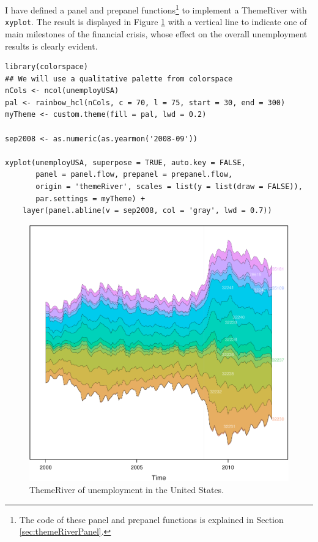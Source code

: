 \documentclass[smallroyalvopaper]{memoir}
\begin{document}
I have defined a panel and prepanel functions\footnote{The code of these panel and prepanel functions is explained
in Section \ref{sec:themeRiverPanel}.} to implement a
ThemeRiver with \texttt{xyplot}. The result is displayed in Figure
\ref{fig:unemployUSAThemeRiver} with a vertical line to indicate
one of main milestones of the financial crisis, whose effect on
the overall unemployment results is clearly evident.
\lstset{language=r,label= ,caption= ,captionpos=b,numbers=none}
\begin{lstlisting}
library(colorspace)
## We will use a qualitative palette from colorspace
nCols <- ncol(unemployUSA)
pal <- rainbow_hcl(nCols, c = 70, l = 75, start = 30, end = 300)
myTheme <- custom.theme(fill = pal, lwd = 0.2)

sep2008 <- as.numeric(as.yearmon('2008-09'))

xyplot(unemployUSA, superpose = TRUE, auto.key = FALSE,
       panel = panel.flow, prepanel = prepanel.flow,
       origin = 'themeRiver', scales = list(y = list(draw = FALSE)),
       par.settings = myTheme) +
    layer(panel.abline(v = sep2008, col = 'gray', lwd = 0.7))
\end{lstlisting}

\begin{figure}[htbp]
\centering
\includegraphics[width=.9\linewidth]{figs/unemployUSAThemeRiver.pdf}
\caption{ThemeRiver of unemployment in the United States. \label{fig:unemployUSAThemeRiver}}
\end{figure}
\end{document}

